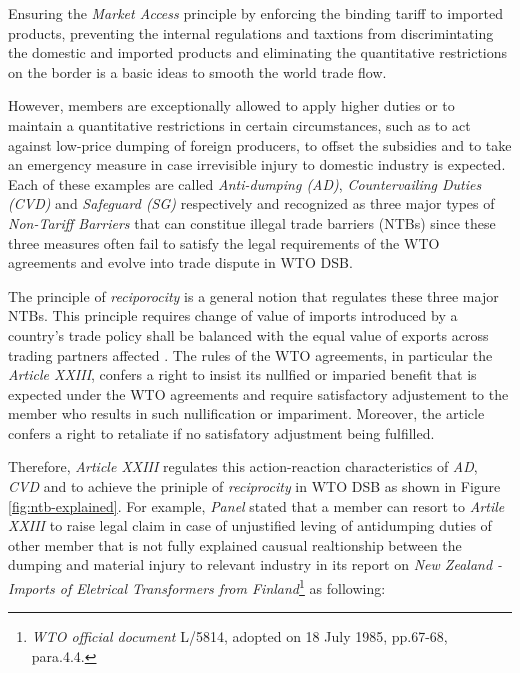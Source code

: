 Ensuring the \textit{Market Access} principle 
by enforcing
the binding tariff to imported products, preventing the internal regulations 
and taxtions from discrimintating the domestic and imported products
and eliminating the quantitative restrictions on the border 
is a basic ideas to smooth the world trade flow. 

However, members are exceptionally allowed to apply higher duties or to maintain a quantitative restrictions in certain circumstances, such as 
to act against low-price dumping of foreign producers, to offset the subsidies
and to take an emergency measure in case irrevisible injury to domestic industry is expected. Each of these examples 
are called \textit{Anti-dumping (AD)}, \textit{Countervailing Duties (CVD)} and \textit{Safeguard (SG)} respectively and recognized as 
three major types of \textit{Non-Tariff Barriers} that can constitue illegal trade barriers (NTBs)
since these three measures often fail to satisfy the legal requirements of the WTO agreements and evolve into trade dispute in WTO DSB.

The principle of \textit{reciporocity} is a general notion that regulates these three major NTBs.
This principle requires change of value of imports introduced by a country's trade policy 
shall be balanced with the equal value of exports across trading partners affected \citep{bagwell1999}.
The rules of the WTO agreements, in particular the \textit{Article XXIII}, 
confers a right to insist its nullfied or imparied benefit that is expected under the WTO agreements and require satisfactory adjustement to the member 
who results in such nullification or impariment. Moreover, the article confers a right to retaliate if no satisfatory adjustment being fulfilled.

Therefore, \textit{Article XXIII} regulates this action-reaction characteristics of \textit{AD}, \textit{CVD} and  to achieve the priniple of \textit{reciprocity} in WTO DSB as shown in Figure \ref{fig:ntb-explained}.
For example, \textit{Panel} stated that a member can resort to \textit{Artile XXIII} to raise legal claim in case of unjustified leving of antidumping duties of other member that is not fully explained causual realtionship between the dumping and material injury to relevant industry in its report on \textit{New Zealand - Imports of Eletrical Transformers from Finland}\footnote{\textit{WTO official document} L/5814, adopted on 18 July 1985, pp.67-68, para.4.4.} as following:

